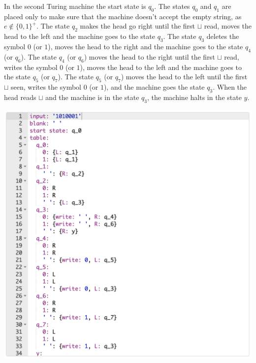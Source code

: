 \documentclass[a4paper]{article}
\begin{document}
In the second Turing machine the start state is $q_0$. The states $q_0$ and $q_1$ are placed only to make sure that the machine doesn't accept the empty string, as $e \notin \{0,1\}^+$. The state $q_2$ makes the head go right until the first $\sqcup$ read, moves the head to the left and the machine goes to the state $q_3$. The state $q_3$ deletes the symbol $0$ (or $1$), moves the head to the right and the machine goes to the state $q_4$ (or $q_6$). The state $q_4$ (or $q_6$) moves the head to the right until the first $\sqcup$ read, writes the symbol $0$ (or $1$), moves the head to the left and the machine goes to the state $q_5$ (or $q_7$). The state $q_5$ (or $q_7$) moves the head to the left until the first $\sqcup$ seen, writes the symbol $0$ (or $1$), and the machine goes the state $q_3$. When the head reads $\sqcup$ and the machine is in the state $q_3$, the machine halts in the state $y$.

\includegraphics[width=\textwidth]{TM2.2}

\newpage
\end{document}
